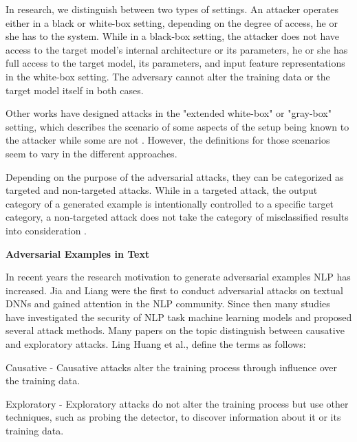 In research, we distinguish between two types of settings.
An attacker operates either in a black or white-box setting, depending on the degree of access, he or she has to the system. While in a black-box setting, the attacker does not have access to the target model's internal architecture or its parameters, he or she has full access to the target model, its parameters, and input feature representations in the white-box setting. The adversary cannot alter the training data or the target model itself in both cases.

Other works have designed attacks in the "extended white-box" or "gray-box" setting, which describes the scenario of some aspects of the setup being known to the attacker while some are not \cite{vivek2018gray}. However, the definitions for those scenarios seem to vary in the different approaches.

Depending on the purpose of the adversarial attacks, they can be categorized as targeted and non-targeted attacks. While in a targeted attack, the output category of a generated example is intentionally controlled to a specific target category, a non-targeted attack does not take the category of misclassified results into consideration \cite{vijayaraghavan2019generating}.



\textbf{Adversarial Examples in Text}

    \label{sec:adversarial_exapmles_in_text}

In recent years the research motivation to generate adversarial examples NLP has increased. Jia and Liang were the first to conduct adversarial attacks on textual DNNs and gained attention in the NLP community\cite{Jia2017AdversarialEF}. Since then many studies have investigated the security of NLP task machine learning models and proposed several attack methods. Many papers on the topic distinguish between causative and exploratory attacks. Ling Huang et al., define the terms as follows:

Causative -  Causative attacks alter the training process through influence over the training data.

Exploratory - Exploratory attacks do not alter the training process but use other techniques, such as probing the detector, to discover information about it or its training data.
\cite{huang2011adversarial}

